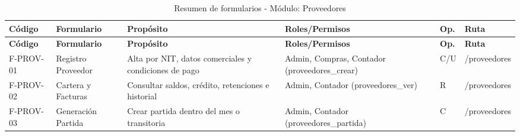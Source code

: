 {
\small
{}
\setlength{\parindent}{0pt}
\begin{xltabular}{\linewidth}{
    >{\raggedright\arraybackslash}p{1.8cm} 
    >{\raggedright\arraybackslash}p{2.8cm} 
    >{\raggedright\arraybackslash}X 
    >{\raggedright\arraybackslash}p{2.5cm} 
    >{\centering\arraybackslash}p{0.8cm} 
    >{\raggedright\arraybackslash}p{2.0cm}
}

    \caption{Resumen de formularios - Módulo: Proveedores} \label{tab:cap4_proveedores_resumen} \\
    \toprule
    \textbf{Código} & \textbf{Formulario} & \textbf{Propósito} & \textbf{Roles/Permisos} & \textbf{Op.} & \textbf{Ruta} \\
    \midrule
    \endfirsthead

    \toprule
    \textbf{Código} & \textbf{Formulario} & \textbf{Propósito} & \textbf{Roles/Permisos} & \textbf{Op.} & \textbf{Ruta} \\
    \midrule
    \endhead

    \endfoot

\bottomrule
\endlastfoot

    F-PROV-01 & Registro Proveedor & Alta por NIT, datos comerciales y condiciones de pago & Admin, Compras, Contador (\textrm{proveedores\_crear}) & C/U & \textrm{/proveedores} \\
    \addlinespace
    F-PROV-02 & Cartera y Facturas & Consultar saldos, crédito, retenciones e historial & Admin, Contador (\textrm{proveedores\_ver}) & R & \textrm{/proveedores} \\
    \addlinespace
    F-PROV-03 & Generación Partida & Crear partida dentro del mes o transitoria & Admin, Contador (\textrm{proveedores\_partida}) & C & \textrm{/proveedores} \\
\end{xltabular}
}

